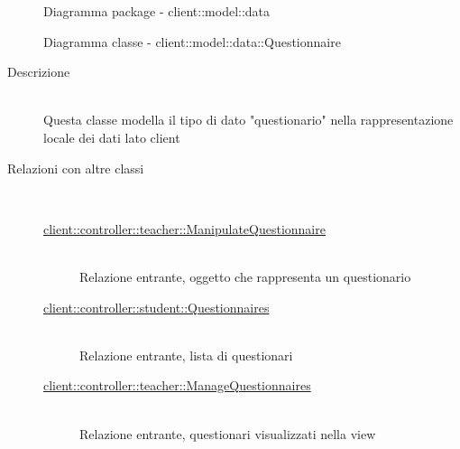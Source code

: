 \begin{center}
\begin{figure}[H]
		\caption{Diagramma package - client::model::data}
	\end{figure}
\end{center}\hypertarget{client::model::data::Questionnaire}{}
\begin{figure}[H]
	\centering
	\caption{Diagramma classe - client::model::data::Questionnaire}
\end{figure}\begin{description}
\item[Descrizione] \hfill \\
Questa classe modella il tipo di dato "questionario" nella rappresentazione locale dei dati lato client
\item[Relazioni con altre classi] \hfill \\
\vspace{-7mm}
\begin{description}
	\item[\hyperlink{client::controller::teacher::ManipulateQuestionnaire}{client::controller::teacher::ManipulateQuestionnaire}] \hfill \\
	Relazione entrante, oggetto che rappresenta un questionario
	\item[\hyperlink{client::controller::student::Questionnaires}{client::controller::student::Questionnaires}] \hfill \\
	Relazione entrante, lista di questionari
	\item[\hyperlink{client::controller::teacher::ManageQuestionnaires}{client::controller::teacher::ManageQuestionnaires}] \hfill \\
	Relazione entrante, questionari visualizzati nella view
\end{description}


\end{description}
